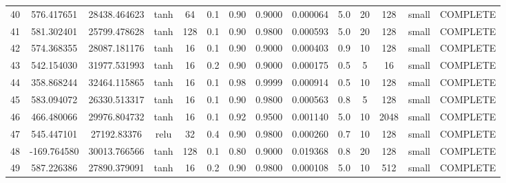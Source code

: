\begin{longtable}{cccccccccccccc}
                       40 &                 576.417651 &                       28438.464623 &            tanh &          64 &         0.1 &        0.90 & 0.9000 &       0.000064 &             5.0 &        20 &      128 &     small & COMPLETE \\
                       41 &                 581.302401 &                       25799.478628 &            tanh &         128 &         0.1 &        0.90 & 0.9800 &       0.000593 &             5.0 &        20 &      128 &     small & COMPLETE \\
                       42 &                 574.368355 &                       28087.181176 &            tanh &          16 &         0.1 &        0.90 & 0.9000 &       0.000403 &             0.9 &        10 &      128 &     small & COMPLETE \\
                       43 &                 542.154030 &                       31977.531993 &            tanh &          16 &         0.2 &        0.90 & 0.9000 &       0.000175 &             0.5 &         5 &       16 &     small & COMPLETE \\
                       44 &                 358.868244 &                       32464.115865 &            tanh &          16 &         0.1 &        0.98 & 0.9999 &       0.000914 &             0.5 &        10 &      128 &     small & COMPLETE \\
                       45 &                 583.094072 &                       26330.513317 &            tanh &          16 &         0.1 &        0.90 & 0.9800 &       0.000563 &             0.8 &         5 &      128 &     small & COMPLETE \\
                       46 &                 466.480066 &                       29976.804732 &            tanh &          16 &         0.1 &        0.92 & 0.9500 &       0.001140 &             5.0 &        10 &     2048 &     small & COMPLETE \\
                       47 &                 545.447101 &                        27192.83376 &            relu &          32 &         0.4 &        0.90 & 0.9800 &       0.000260 &             0.7 &        10 &      128 &     small & COMPLETE \\
                       48 &                -169.764580 &                       30013.766566 &            tanh &         128 &         0.1 &        0.80 & 0.9000 &       0.019368 &             0.8 &        20 &      128 &     small & COMPLETE \\
                       49 &                 587.226386 &                       27890.379091 &            tanh &          16 &         0.2 &        0.90 & 0.9800 &       0.000108 &             5.0 &        10 &      512 &     small & COMPLETE \\
\end{longtable}
